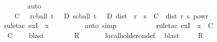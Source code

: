 \begin{isabellebody}
\ \ \ \ \ \ \isamarkupfalse%
\ auto\isanewline
\ \ \ \ \isamarkupfalse%
\ {\isachardoublequoteopen}{\isasymexists}{\isasymepsilon}\ {\isachargreater}{\kern0pt}\ {}{\isachardot}{\kern0pt}\ {\isasymexists}C\ {\isasymge}\ {}{\isachardot}{\kern0pt}\ {\isasymforall}r{\isasymin}cball\ t\ {\isasymepsilon}\ {\isasyminter}\ D{\isachardot}{\kern0pt}\ {\isasymforall}s{\isasymin}cball\ t\ {\isasymepsilon}\ {\isasyminter}\ D{\isachardot}{\kern0pt}\ dist\ {\isacharparenleft}{\kern0pt}{\isasymphi}\ r{\isacharparenright}{\kern0pt}\ {\isacharparenleft}{\kern0pt}{\isasymphi}\ s{\isacharparenright}{\kern0pt}\ {\isasymle}\ C\ {\isacharasterisk}{\kern0pt}\ dist\ r\ s\ powr\ {\isasymgamma}{\isachardoublequoteclose}\isanewline
\ \ \ \ \ \ \isamarkupfalse%
\ {\isacharparenleft}{\kern0pt}rule{\isacharunderscore}{\kern0pt}tac\ exI\ {\isacharbrackleft}{\kern0pt}\ x\ {\isacharequal}{\kern0pt}\ {\isachardoublequoteopen}{\isasymepsilon}{\isacharslash}{\kern0pt}{}{\isachardoublequoteclose}{\isacharbrackright}{\kern0pt}{\isacharparenright}{\kern0pt}\isanewline
\ \ \ \ \ \ \isamarkupfalse%
\ {\isacharparenleft}{\kern0pt}auto\ simp{\isacharcolon}{\kern0pt}\ {\isacartoucheopen}{\isasymepsilon}\ {\isachargreater}{\kern0pt}\ {}{\isacartoucheclose}{\isacharparenright}{\kern0pt}\isanewline
\ \ \ \ \ \ \isamarkupfalse%
\ {\isacharparenleft}{\kern0pt}rule{\isacharunderscore}{\kern0pt}tac\ exI\ {\isacharbrackleft}{\kern0pt}\ x\ {\isacharequal}{\kern0pt}\ {\isachardoublequoteopen}C{\isachardoublequoteclose}{\isacharbrackright}{\kern0pt}{\isacharparenright}{\kern0pt}\isanewline
\ \ \ \ \ \ \isamarkupfalse%
\ {\isacharasterisk}{\kern0pt}{\isacharasterisk}{\kern0pt}\ {\isacartoucheopen}C\ {\isasymge}\ {}{\isacartoucheclose}\ \isamarkupfalse%
\ blast\isanewline
\ \ \isacommand{{\isacharbraceright}{\kern0pt}}\isamarkupfalse%
\isanewline
\ \ \isamarkupfalse%
\ \isamarkupfalse%
\ {\isacharquery}{\kern0pt}R\isanewline
\ \ \ \ \isamarkupfalse%
\ {\isacharasterisk}{\kern0pt}\ local{\isacharunderscore}{\kern0pt}holder{\isacharunderscore}{\kern0pt}on{\isacharunderscore}{\kern0pt}def\ \isamarkupfalse%
\ blast\isanewline
{}\isamarkupfalse%
\isanewline
\ \ \isamarkupfalse%
\ {\isacharasterisk}{\kern0pt}{\isacharcolon}{\kern0pt}\ {\isacharquery}{\kern0pt}R\isanewline
\ \ \isacommand{{\isacharbraceleft}{\kern0pt}}\isamarkupfalse%

\end{isabellebody}
